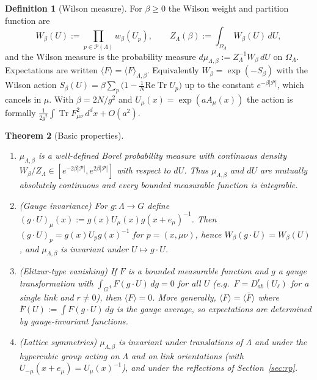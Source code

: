 \documentclass[11pt,a4paper]{article}
\newtheorem{theorem}{Theorem}[section]
\theoremstyle{definition}
\newtheorem{definition}[theorem]{Definition}
\theoremstyle{remark}
\DeclareMathOperator{\Tr}{Tr}
\newcommand{\cP}{\mathcal{P}}
\newcommand{\dU}{\,dU}
\begin{document}
\begin{definition}[Wilson measure]\label{def:wilson}
For $\beta\ge0$ the Wilson weight and partition function are
\[
W_\beta(U):=\prod_{p\in\cP(\Lambda)}w_\beta(U_p),\qquad
Z_\Lambda(\beta):=\int_{\Omega_\Lambda}W_\beta(U)\dU,
\]
and the Wilson measure is the probability measure $d\mu_{\Lambda,\beta}:=Z_\Lambda^{-1}W_\beta\dU$ on $\Omega_\Lambda$.
Expectations are written $\langle F\rangle=\langle F\rangle_{\Lambda,\beta}$. Equivalently
$W_\beta=\exp(-S_\beta)$ with the Wilson action $S_\beta(U)=\beta\sum_p\bigl(1-\frac1N\mathrm{Re}\Tr U_p\bigr)$ up to the
constant $e^{-\beta|\cP|}$, which cancels in $\mu$. With $\beta=2N/g^2$ and $U_\mu(x)=\exp(aA_\mu(x))$ the
action is formally $\frac1{2g^2}\int\Tr F_{\mu\nu}^2\,d^dx+O(a^2)$.
\end{definition}

\begin{theorem}[Basic properties]\label{thm:basic}
\begin{enumerate}[label=(\roman*)]
\item $\mu_{\Lambda,\beta}$ is a well-defined Borel probability measure with continuous density
$W_\beta/Z_\Lambda\in[e^{-2\beta|\cP|},e^{2\beta|\cP|}]$ with respect to $dU$. Thus $\mu_{\Lambda,\beta}$ and $dU$ are mutually
absolutely continuous and every bounded measurable function is integrable.
\item (Gauge invariance) For $g:\Lambda\to G$ define $(g\cdot U)_\mu(x):=g(x)U_\mu(x)g(x+e_\mu)^{-1}$. Then
$(g\cdot U)_p=g(x)U_pg(x)^{-1}$ for $p=(x,\mu\nu)$, hence $W_\beta(g\cdot U)=W_\beta(U)$, and $\mu_{\Lambda,\beta}$ is
invariant under $U\mapsto g\cdot U$.
\item (Elitzur-type vanishing) If $F$ is a bounded measurable function and $g$ a gauge transformation with
$\int_{G^\Lambda}F(g\cdot U)\,dg=0$ for all $U$ (e.g.\ $F=D^r_{ab}(U_\ell)$ for a single link and $r\neq0$),
then $\langle F\rangle=0$. More generally, $\langle F\rangle=\langle\bar F\rangle$ where
$\bar F(U):=\int F(g\cdot U)\,dg$ is the gauge average, so expectations are determined by gauge-invariant
functions.
\item (Lattice symmetries) $\mu_{\Lambda,\beta}$ is invariant under translations of $\Lambda$ and under the
hypercubic group acting on $\Lambda$ and on link orientations (with $U_{-\mu}(x+e_\mu)=U_\mu(x)^{-1}$), and
under the reflections of Section~\ref{sec:rp}.
\end{enumerate}
\end{theorem}
\end{document}

